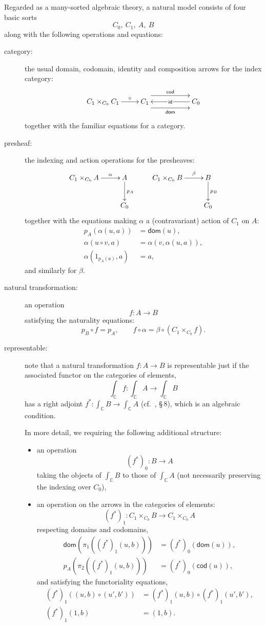 \documentclass[12pt]{article}
\newcommand{\C}{\ensuremath{\mathbb{C}}}
\newcommand{\dom}{\ensuremath{\mathsf{dom}}}
\newcommand{\cod}{\ensuremath{\mathsf{cod}}}
\newcommand{\identity}{\ensuremath{\mathsf{id}}}
\theoremstyle{definition}
\begin{document}
Regarded as a many-sorted algebraic theory, a natural model consists of four basic sorts $$C_0,\ C_1,\ A,\ B$$ along with the following operations and equations:
\begin{description}
\item[category:] the usual domain, codomain, identity and composition arrows for the index category:
\[
\xymatrix{
C_1 \times_{C_0} C_1 \ar[r]^-{\circ} & C_1 {\ar@<-2ex>[rr]_{\dom} \ar@<2ex>[rr]^{\cod}} && \ar[ll]|-{\,\identity\,} C_0
}
\]
together with the familiar equations for a category.

\item[presheaf:] the indexing and action operations for the presheaves: 
\[
\xymatrix{
C_1 \times_{C_0} A  \ar[r]^-{\alpha} & A \ar[d]^{p_A} \\
& C_0
}
\qquad
\xymatrix{
C_1 \times_{C_0} B \ar[r]^-{\beta} & B \ar[d]^{p_B} \\
& C_0
}
\]
together with the equations making $\alpha$ a (contravariant) action of $C_1$ on $A$:
\begin{align*}
 p_A(\alpha(u, a)) &= \dom(u),\\
 \alpha(u\circ v, a) &= \alpha(v,\alpha(u,a)),\\
 \alpha(1_{p_{A}(a)},a) &= a,
\end{align*}
and similarly for $\beta$.

\item[natural transformation:] an operation 
\[
f : A \to B
\]
satisfying the naturality equations: $$p_B \circ f = p_A,\qquad f\circ\alpha = \beta\circ(C_1\times_{C_0}f).$$

\item[representable:] note that a natural transformation $f : A \to B$ is representable just if the associated functor on the categories of elements,
\[
\textstyle{\int_\C{f} : \int_\C{A} \to \int_\C{B}}
\]
has a right adjoint $f^* : \int_\C{B} \to \int_\C{A}$ (cf.~\cite{ABSS}, \S\,8), which is an algebraic condition.  

In more detail, we requiring the following additional structure:

\begin{itemize}
\item an operation
\[
(f^*)_0 : B \to A
\]
taking the objects of $\int_\C{B}$ to  those of $\int_\C{A}$ (not necessarily preserving the indexing over $C_0$), 

\item an operation on the arrows in the categories of elements:
\[
(f^*)_1 : C_1 \times_{C_0} B \to C_1 \times_{C_0} A
\]
respecting domains and codomains,
\begin{align*}
\dom(\pi_1( (f^*)_1 (u, b) )) &= (f^*)_0(\dom(u)),\\
 p_A(\pi_2( (f^*)_1 (u, b) )) &= (f^*)_0(\cod(u)),
\end{align*}
and satisfying the functoriality equations, 
\begin{align*}
 (f^*)_1((u,b)\circ(u', b')) &=  (f^*)_1(u,b)\circ (f^*)_1(u', b'),\\
 (f^*)_1(1,b)&= (1,b).
\end{align*}


\end{itemize}
\end{description}
\end{document}
